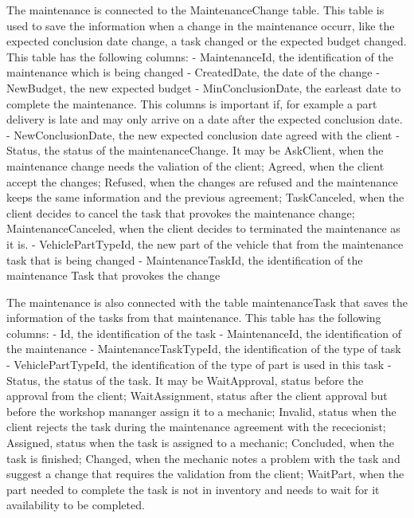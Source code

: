 The maintenance is connected to the MaintenanceChange table. This table is used to save the information when a change in the maintenance occurr, like the expected conclusion date change, a task changed or the expected budget changed.
This table has the following columns:
- MaintenanceId, the identification of the maintenance which is being changed
- CreatedDate, the date of the change
- NewBudget, the new expected budget
- MinConclusionDate, the earleast date to complete the maintenance. This columns is important if, for example a part delivery is late and may only arrive on a date after the expected conclusion date.
- NewConclusionDate, the new expected conclusion date agreed with the client
- Status, the status of the maintenanceChange. It may be AskClient, when the maintenance change needs the valiation of the client; Agreed, when the client accept the changes; Refused, when the changes are refused and the maintenance keeps the same information and the previous agreement; TaskCanceled, when the client decides to cancel the task that provokes the maintenance change; MaintenanceCanceled, when the client decides to terminated the maintenance as it is.
- VehiclePartTypeId, the new part of the vehicle that from the maintenance task that is being changed
- MaintenanceTaskId, the identification of the maintenance Task that provokes the change

The maintenance is also connected with the table maintenanceTask that saves the information of the tasks from that maintenance.
This table has the following columns:
- Id, the identification of the task
- MaintenanceId, the identification of the maintenance
- MaintenanceTaskTypeId, the identification of the type of task
- VehiclePartTypeId, the identification of the type of part is used in this task
- Status, the status of the task. It may be WaitApproval, status before the approval from the client; WaitAssignment, status after the client approval but before the workshop mananger assign it to a mechanic; Invalid, status when the client rejects the task during the maintenance agreement with the rececionist; Assigned, status when the task is assigned to a mechanic; Concluded, when the task is finished; Changed, when the mechanic notes a problem with the task and suggest a change that requires the validation from the client; WaitPart, when the part needed to complete the task is not in inventory and needs to wait for it availability to be completed.


